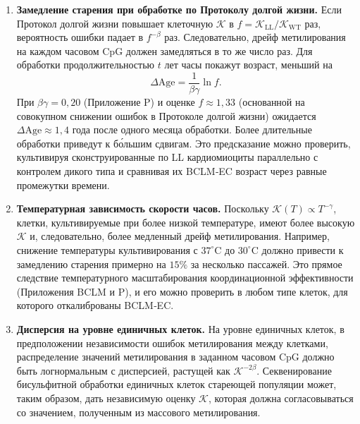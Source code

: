 \documentclass[12pt,a4paper]{article}
\newcommand{\REL}{\mathcal{K}}          %
\begin{document}
	\begin{enumerate}
		\item \textbf{Замедление старения при обработке по Протоколу долгой жизни.}
		Если Протокол долгой жизни повышает клеточную \(\REL\) в \(f = \REL_{\mathrm{LL}}/\REL_{\mathrm{WT}}\) раз, вероятность ошибки падает в \(f^{-\beta}\) раз. Следовательно, дрейф метилирования на каждом часовом CpG должен замедляться в то же число раз. Для обработки продолжительностью \(t\) лет часы покажут возраст, меньший на
		\[
		\Delta\mathrm{Age} = \frac{1}{\beta\gamma} \ln f.
		\]
		При \(\beta\gamma = 0,20\) (Приложение P) и оценке \(f \approx 1,33\) (основанной на совокупном снижении ошибок в Протоколе долгой жизни) ожидается \(\Delta\mathrm{Age} \approx 1,4\) года после одного месяца обработки. Более длительные обработки приведут к б\'{о}льшим сдвигам. Это предсказание можно проверить, культивируя сконструированные по LL кардиомиоциты параллельно с контролем дикого типа и сравнивая их BCLM‑EC возраст через равные промежутки времени.
		
		\item \textbf{Температурная зависимость скорости часов.}
		Поскольку \(\REL(T) \propto T^{-\gamma}\), клетки, культивируемые при более низкой температуре, имеют более высокую \(\REL\) и, следовательно, более медленный дрейф метилирования. Например, снижение температуры культивирования с \(37^\circ\text{C}\) до \(30^\circ\text{C}\) должно привести к замедлению старения примерно на \(15\%\) за несколько пассажей. Это прямое следствие температурного масштабирования координационной эффективности (Приложения BCLM и P), и его можно проверить в любом типе клеток, для которого откалиброваны BCLM‑EC.
		
		\item \textbf{Дисперсия на уровне единичных клеток.}
		На уровне единичных клеток, в предположении независимости ошибок метилирования между клетками, распределение значений метилирования в заданном часовом CpG должно быть логнормальным с дисперсией, растущей как \(\REL^{-2\beta}\). Секвенирование бисульфитной обработки единичных клеток стареющей популяции может, таким образом, дать независимую оценку \(\REL\), которая должна согласовываться со значением, полученным из массового метилирования.
	\end{enumerate}
	
\end{document}
